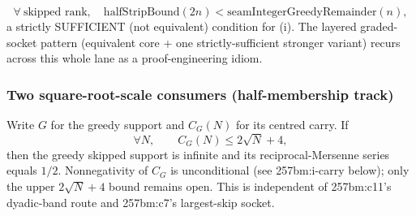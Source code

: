 \begin{thm}
\[
\forall\ \text{skipped rank},\quad \mathrm{halfStripBound}(2n) < \mathrm{seamIntegerGreedyRemainder}(n),
\]
a strictly SUFFICIENT (not equivalent) condition for (i). The layered graded-socket pattern
(equivalent core + one strictly-sufficient stronger variant) recurs across this whole lane as
a proof-engineering idiom.
\par\noindent{}    
\end{thm}

\subsubsection*{Two square-root-scale consumers (half-membership track)}

\begin{thm}
Write $G$ for the greedy support and $C_G(N)$ for its centred carry. If
\[
\forall N,\qquad C_G(N) \le 2\sqrt N + 4,
\]
then the greedy skipped support is infinite and its reciprocal-Mersenne series equals $1/2$.
Nonnegativity of $C_G$ is unconditional (see 257bm:i-carry below); only the upper
$2\sqrt N+4$ bound remains open. This is independent of 257bm:c11's dyadic-band route and
257bm:c7's largest-skip socket.
\par\noindent{}    
\end{thm}

